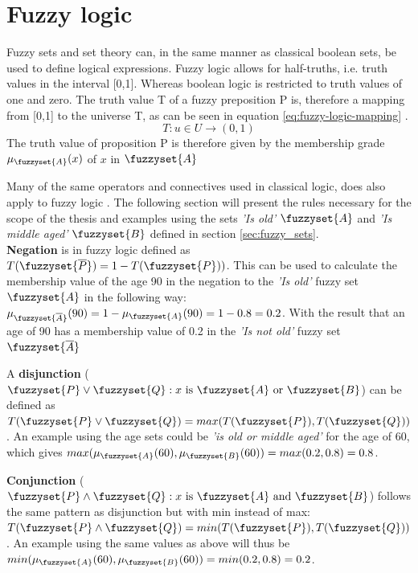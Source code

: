 \section{Fuzzy logic}
\label{section:fuzzy_logic}
Fuzzy sets and set theory can, in the same manner as classical boolean sets, be used to define logical expressions. Fuzzy logic allows for half-truths, i.e. truth values in the interval [0,1]. Whereas boolean logic is restricted to truth values of one and zero. The truth value T of a fuzzy preposition P is, therefore a mapping from [0,1] to the universe T, as can be seen in equation \ref{eq:fuzzy-logic-mapping} \cite{ross2009fuzzy}.
\begin{equation}
    T:u\in U\rightarrow (0,1)
    \label{eq:fuzzy-logic-mapping}
\end{equation}
The truth value of proposition P is therefore given by the membership grade $\mu_{\fuzzyset{A}}(x)$ of $x$ in $\fuzzyset{A}$

Many of the same operators and connectives used in classical logic, does also apply to fuzzy logic \cite{ross2009fuzzy}.
The following section will present the rules  necessary for the scope of the thesis and examples using the sets \textit{'Is old'} $\fuzzyset{A}$ and \textit{'Is middle aged'} $\fuzzyset{B}$  defined in section \ref{sec:fuzzy_sets}.\\

\textbf{Negation} is in fuzzy logic defined as $ T(\fuzzyset{\overline{P}})=1-T(\fuzzyset{P}))$. This can be used to calculate the membership value of the age 90 in the negation to the \textit{'Is old'}  fuzzy set $\fuzzyset{A}$ in the following way:
$\mu_{\fuzzyset{\overline{A}}}(90)=1-\mu_{\fuzzyset{A}}(90)=1-0.8=0.2$. With the result that an age of 90 has a membership value of 0.2 in the \textit{'Is not old'} fuzzy set $\fuzzyset{\overline{A}}$

A \textbf{disjunction} ($\fuzzyset{P}\lor \fuzzyset{Q}:x \text{ is } \fuzzyset{A} \text{ or } \fuzzyset{B}$)   can be defined as   $T(\fuzzyset{P} \lor \fuzzyset{Q}) = \\ max(T(\fuzzyset{P}),T(\fuzzyset{Q}))$. An example using the age sets could be \textit{'is old or middle aged'} for the age of 60, which gives $max(\mu_{\fuzzyset{A}}(60),\mu_{\fuzzyset{B}}(60))=max(0.2,0.8)=0.8$.

\textbf{Conjunction} ($\fuzzyset{P}\land \fuzzyset{Q}:x \text{ is } \fuzzyset{A} \text{ and } \fuzzyset{B}$) follows the same pattern as disjunction but with min instead of max: $T(\fuzzyset{P} \land \fuzzyset{Q})=min(T(\fuzzyset{P}),T(\fuzzyset{Q}))$.
An example using the same values as above will thus be $min(\mu_{\fuzzyset{A}}(60),\mu_{\fuzzyset{B}}(60))=min(0.2,0.8)=0.2$.

